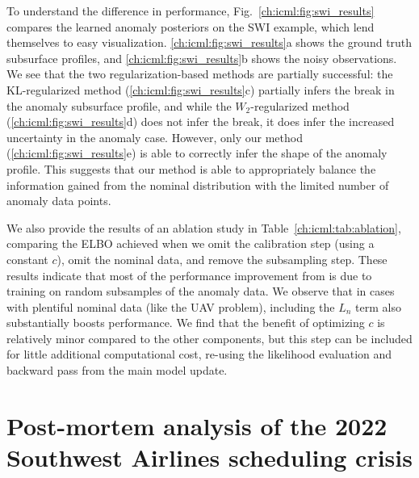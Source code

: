 To understand the difference in performance, Fig.~\ref{ch:icml:fig:swi_results} compares the learned anomaly posteriors on the SWI example, which lend themselves to easy visualization. \ref{ch:icml:fig:swi_results}a shows the ground truth subsurface profiles, and \ref{ch:icml:fig:swi_results}b shows the noisy observations.
%
We see that the two regularization-based methods are partially successful: the KL-regularized method (\ref{ch:icml:fig:swi_results}c) partially infers the break in the anomaly subsurface profile, and while the $W_2$-regularized method (\ref{ch:icml:fig:swi_results}d) does not infer the break, it does infer the increased uncertainty in the anomaly case. However, only our method (\ref{ch:icml:fig:swi_results}e) is able to correctly infer the shape of the anomaly profile. This suggests that our method is able to appropriately balance the information gained from the nominal distribution with the limited number of anomaly data points.

We also provide the results of an ablation study in Table~\ref{ch:icml:tab:ablation}, comparing the ELBO achieved when we omit the calibration step (using a constant $c$), omit the nominal data, and remove the subsampling step. These results indicate that most of the performance improvement from \ouralg{} is due to training on random subsamples of the anomaly data. We observe that in cases with plentiful nominal data (like the UAV problem), including the $L_n$ term also substantially boosts performance. We find that the benefit of optimizing $c$ is relatively minor compared to the other components, but this step can be included for little additional computational cost, re-using the likelihood evaluation and backward pass from the main model update.

\section{Post-mortem analysis of the 2022 Southwest Airlines scheduling crisis}\label{ch:icml:wn-case-study}

